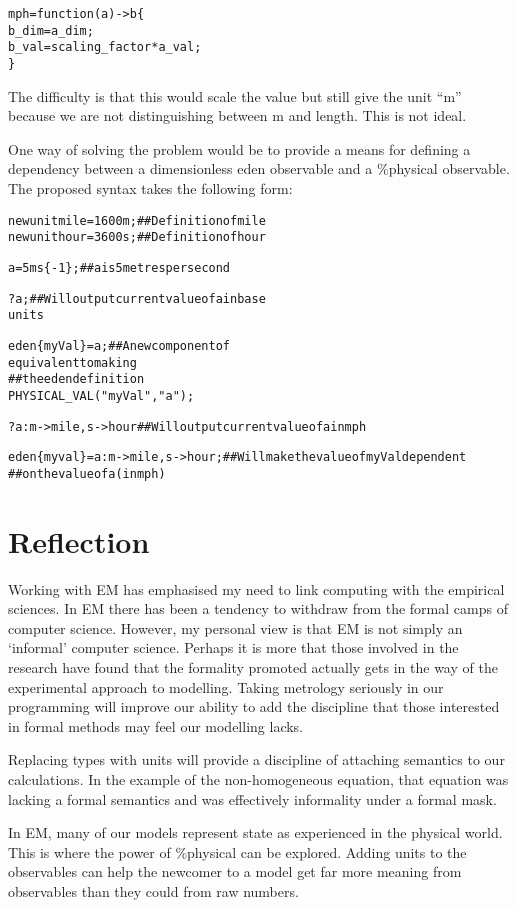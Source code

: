 \documentclass[a4paper]{article}
\begin{document}
\begin{alltt}
mph = function (a) -> b \{
    b_dim = a_dim;
    b_val = scaling_factor * a_val;
\}
\end{alltt}

The difficulty is that this would scale the value but still give the unit ``m'' 
because we are not distinguishing between m and length. This is not ideal. 

One way of solving the problem would be to provide a means for defining a 
dependency between a dimensionless eden observable and a \%physical observable. 
The proposed syntax takes the following form:

\begin{alltt}
%physical 
new unit mile = 1600 m;             ## Definition of mile
new unit hour = 3600 s;             ## Definition of hour

a = 5 ms\{-1\};                       ## a is 5 metres per second

?a;                                 ## Will output current value of a in base 
units

eden\{myVal\} = a;                    ## A new component of %physical that is 
equivalent to making 
                                    ##   the eden definition 
PHYSICAL_VAL("myVal","a");

?a : m->mile,s->hour                ## Will output current value of a in mph

eden\{myval\} =  a : m->mile,s->hour; ## Will make the value of myVal dependent 
                                    ##   on the value of a (in mph)

\end{alltt}

\section{Reflection}
Working with EM has emphasised my need to link computing with the empirical 
sciences. In EM there has been a tendency to withdraw from the formal camps of 
computer science. However, my personal view is that EM is not simply an 
`informal' computer science. Perhaps it is more that those involved in the 
research have found that the formality promoted actually gets in the way of the 
experimental approach to modelling. Taking metrology seriously in our 
programming will improve our ability to add the discipline that those 
interested in formal methods may feel our modelling lacks.

Replacing types with units will provide a discipline of attaching semantics to 
our calculations. In the example of the non-homogeneous equation, that equation 
was lacking a formal semantics and was effectively informality under a formal 
mask. 

In EM, many of our models represent state as experienced in the physical world. 
This is where the power of 
\%physical can be explored. Adding units to the observables can help the 
newcomer to a model get far more meaning from observables than they could 
from raw numbers.




\end{document}
